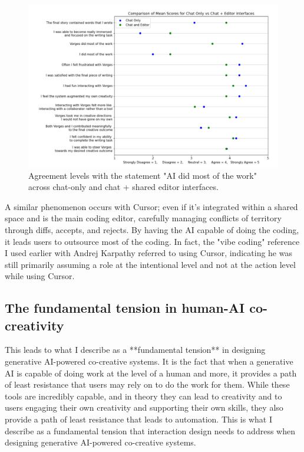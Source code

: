 \begin{figure}
    \centering
    \includegraphics[width=1\linewidth]{graphsharedspaces.png}
    \caption{Agreement levels with the statement "AI did most of the work" across chat-only and chat + shared editor interfaces.}
    \label{fig:graphsharedspaces}
\end{figure}

A similar phenomenon occurs with Cursor; even if it's integrated within a shared space and is the main coding editor, carefully managing conflicts of territory through diffs, accepts, and rejects. By having the AI capable of doing the coding, it leads users to outsource most of the coding. In fact, the "vibe coding" reference I used earlier with Andrej Karpathy referred to using Cursor, indicating he was still primarily assuming a role at the intentional level and not at the action level while using Cursor.


\subsection{The fundamental tension in human-AI co-creativity}

This leads to what I describe as a **fundamental tension** in designing generative AI-powered co-creative systems. It is the fact that when a generative AI is capable of doing work at the level of a human and more, it provides a path of least resistance that users may rely on to do the work for them. While these tools are incredibly capable, and in theory they can lead to creativity and to users engaging their own creativity and supporting their own skills, they also provide a path of least resistance that leads to automation. This is what I describe as a fundamental tension that interaction design needs to address when designing generative AI-powered co-creative systems.

